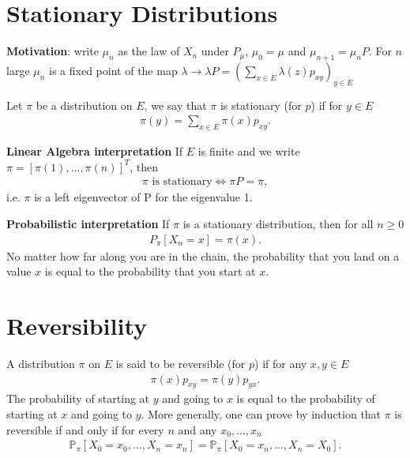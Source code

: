 \section{Stationary Distributions}
\textbf{Motivation}: write $\mu_{n}$ as the law of $X_{n}$ under $P_{\mu}$, $\mu_0=\mu$ and $\mu_{n+1}=\mu_{n}P$. For $n$ large $\mu_n$ is a fixed point of the map $\lambda \to \lambda P = \left( \sum_{x \in E} \lambda(z)p_{xy} \right)_{y \in E}$

\begin{defn}
	Let $\pi$ be a distribution on $E$, we say that $\pi$ is stationary (for $p$) if for $y \in E$
\begin{align}
	\boxed{ \pi(y) = \sum_{x \in E} \pi(x)p_{xy}.}
\end{align}

\textbf{Linear Algebra interpretation} If $E$ is finite and we write  $\pi = [\pi(1), \ldots ,\pi(n)]^T$, then 
\begin{align}
	\boxed{ \pi \textrm{ is stationary} \iff \pi P = \pi ,}
\end{align}
i.e. $\pi$ is a left eigenvector of P for the eigenvalue 1.

\textbf{Probabilistic interpretation} If $\pi $ is a stationary distribution, then for all $ n \geq 0$ 
\begin{align}
	P_{\pi }[X_n =x] = \pi (x)
.\end{align}
No matter how far along you are in the chain, the probability that you land on a value $x$ is equal to the probability that you start at $x$.
\end{defn}

\section{Reversibility}
\begin{defn}
	A distribution $\pi $ on $ E$ is said to be reversible (for $p$) if for any $x,y \in E$
\begin{align}
	\boxed{ \pi (x) p_{xy}= \pi (y)p_{yx}. }
\end{align}
The probability of starting at $y$ and going to $x$ is equal to the probability of starting at $x$ and going to $y$. More generally, one can prove by induction that $\pi $ is reversible if and only if for every $n$ and any $ x_0, \ldots ,x_n$
\begin{align}
\mathbb{P}_{\pi } \left[ X_0=x_0, \ldots ,X_n=x_n \right] = \mathbb{P}_{\pi } \left[ X_0=x_n, \ldots ,X_n=X_0 \right] .
\end{align}

\end{defn}

